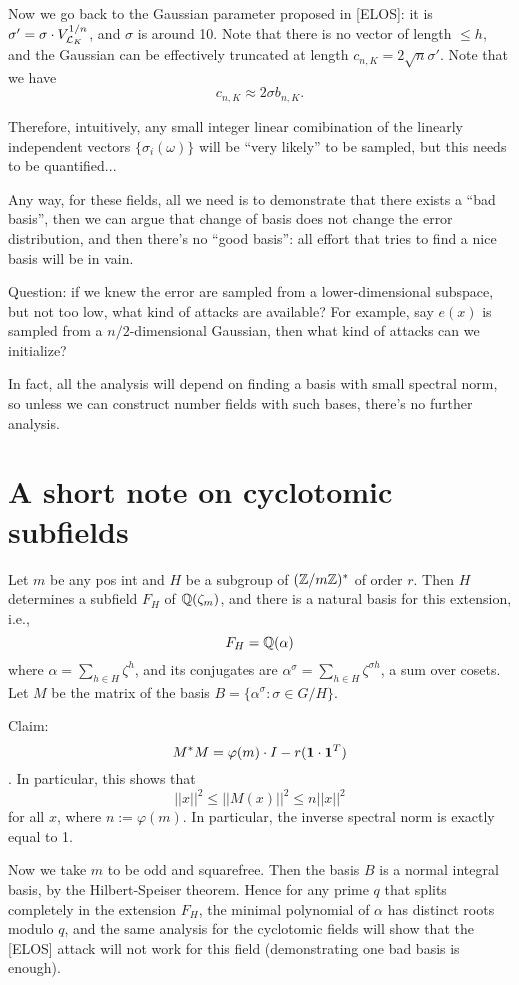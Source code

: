 \documentclass{amsart}
\begin{document}
Now we go back to the Gaussian parameter proposed in [ELOS]:
it is $\sigma' = \sigma \cdot V_{\mathcal{L}_K}^{1/n}$, and $\sigma$ is around 10. Note that there is no vector of length $\leq h$, and the Gaussian can be effectively truncated at length
$c_{n,K} = 2 \sqrt{n} \sigma'$. Note that we have
\[
    c_{n,K} \approx 2 \sigma b_{n,K}.
\]

Therefore, intuitively, any small integer linear comibination of the linearly independent vectors $\{\sigma_i(\omega)\}$ will be ``very likely'' to be sampled, but this needs to be quantified...

Any way, for these fields, all we need is to demonstrate that there exists a ``bad basis'', then we can argue that change of basis does not change the error distribution, and then there's no ``good basis'': all effort that tries to find a nice basis will be in vain.

Question: if we knew the error are sampled from a lower-dimensional subspace, but not too low, what kind of attacks are available? For example, say $e(x)$ is sampled from a $n/2$-dimensional Gaussian, then what kind of attacks can we initialize?

In fact, all the analysis will depend on finding a basis with small spectral norm, so unless we can construct number fields with such bases, there's no further analysis.


\section{A short note on cyclotomic subfields}

Let $m$ be any pos int and $H$ be a subgroup of $(\mathbb{Z}/m\mathbb{Z})^{*}$ of order $r$. Then $H$ determines a subfield $F_H$ of $\mathbb{Q}(\zeta_m)$, and there is a natural basis for this extension, i.e.,
\[
    F_H = \mathbb{Q}(\alpha)
\]
where $\alpha = \sum_{h \in H} \zeta^h$, and its conjugates are $\alpha^{\sigma} = \sum_{h \in H} \zeta^{\sigma h}$, a sum over cosets. Let $M$ be the matrix of the basis $B = \{\alpha^{\sigma}: \sigma \in G/H\}$.

Claim: $$M^*M = \varphi(m) \cdot I - r ({\bf 1} \cdot {\bf 1}^T)$$. In particular, this shows that
\[
   ||x||^2 \leq ||M(x)||^2 \leq n ||x||^2
\]
for all $x$, where $n := \varphi(m)$. In particular, the inverse spectral norm is exactly equal to 1.


Now we take $m$ to be odd and squarefree. Then the basis $B$
is a normal integral basis, by the Hilbert-Speiser theorem. Hence for any prime $q$ that splits completely in the extension $F_H$, the minimal polynomial of $\alpha$ has distinct roots modulo $q$, and the same analysis for the cyclotomic fields will show that the [ELOS] attack will not work for this field (demonstrating one bad basis is enough).
\end{document}
